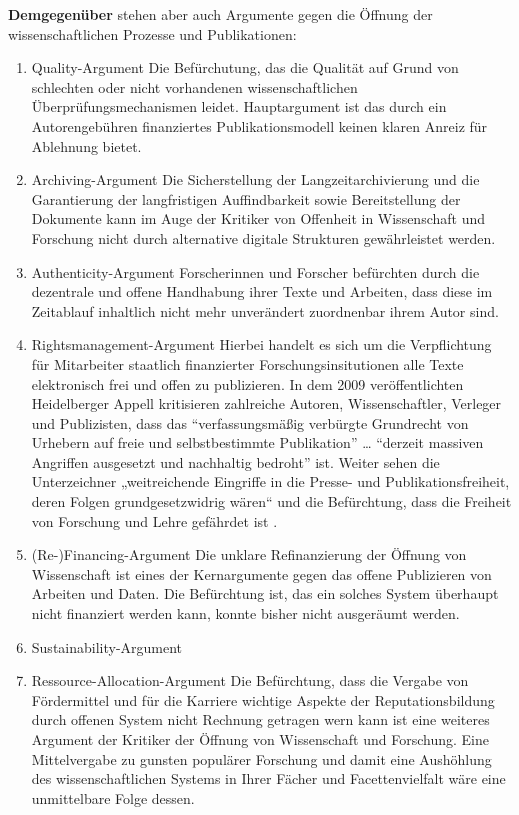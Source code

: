 \textbf{Demgegenüber} stehen aber auch Argumente gegen die Öffnung der wissenschaftlichen Prozesse und Publikationen:
\begin{enumerate}
\item 	Quality-Argument
Die Befürchutung, das die Qualität auf Grund von schlechten oder nicht vorhandenen wissenschaftlichen Überprüfungsmechanismen leidet. Hauptargument ist das durch ein Autorengebühren finanziertes Publikationsmodell keinen klaren Anreiz für Ablehnung bietet.
\item Archiving-Argument
Die Sicherstellung der Langzeitarchivierung und die Garantierung der langfristigen Auffindbarkeit sowie Bereitstellung der Dokumente kann im Auge der Kritiker von Offenheit in Wissenschaft und Forschung nicht durch alternative digitale Strukturen gewährleistet werden. 
\item Authenticity-Argument
Forscherinnen und Forscher befürchten durch die dezentrale und offene Handhabung ihrer Texte und Arbeiten, dass diese im Zeitablauf inhaltlich nicht mehr unverändert zuordnenbar ihrem Autor sind.
\item Rightsmanagement-Argument
Hierbei handelt es sich um die Verpflichtung für Mitarbeiter staatlich finanzierter Forschungsinsitutionen alle Texte elektronisch frei und offen zu publizieren. In dem 2009 veröffentlichten Heidelberger Appell kritisieren zahlreiche Autoren, Wissenschaftler, Verleger und Publizisten, dass das “verfassungsmäßig verbürgte Grundrecht von Urhebern auf freie und selbstbestimmte Publikation” … “derzeit massiven Angriffen ausgesetzt und nachhaltig bedroht” ist. Weiter sehen die Unterzeichner „weitreichende Eingriffe in die Presse- und Publikationsfreiheit, deren Folgen grundgesetzwidrig wären“  und die Befürchtung, dass die Freiheit von Forschung und Lehre gefährdet ist . 
\item (Re-)Financing-Argument
Die unklare Refinanzierung der Öffnung von Wissenschaft ist eines der Kernargumente gegen das offene Publizieren von Arbeiten und Daten. Die Befürchtung ist, das ein solches System überhaupt nicht finanziert werden kann, konnte bisher nicht ausgeräumt werden.
\item Sustainability-Argument
\item Ressource-Allocation-Argument
Die Befürchtung, dass die Vergabe von Fördermittel und für die Karriere wichtige Aspekte der Reputationsbildung durch offenen System nicht Rechnung getragen wern kann ist eine weiteres Argument der Kritiker der Öffnung von Wissenschaft und Forschung. Eine Mittelvergabe zu gunsten populärer Forschung und damit eine Aushöhlung des wissenschaftlichen Systems in Ihrer Fächer und Facettenvielfalt wäre eine unmittelbare Folge dessen.

\end{enumerate}
